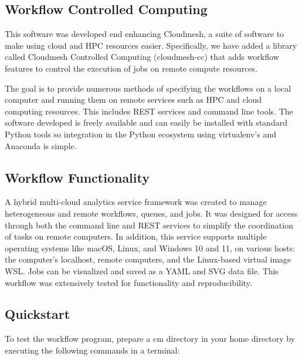 \subsection{Workflow Controlled
Computing}\label{workflow-controlled-computing}

This software was developed end enhancing Cloudmesh, a suite of software
to make using cloud and HPC resources easier. Specifically, we have
added a library called Cloudmesh Controlled Computing (cloudmesh-cc)
that adds workflow features to control the execution of jobs on remote
compute resources.

The goal is to provide numerous methods of specifying the workflows on a
local computer and running them on remote services such as HPC and cloud
computing resources. This includes REST services and command line tools.
The software developed is freely available and can easily be installed
with standard Python tools so integration in the Python ecosystem using
virtualenv's and Anaconda is simple.


\subsection{Workflow Functionality}\label{workflow-functionality}

A hybrid multi-cloud analytics service framework was created to manage
heterogeneous and remote workflows, queues, and jobs. It was designed
for access through both the command line and REST services to simplify
the coordination of tasks on remote computers. In addition, this service
supports multiple operating systems like macOS, Linux, and Windows 10
and 11, on various hosts: the computer's localhost, remote computers,
and the Linux-based virtual image WSL. Jobs can be visualized and saved
as a YAML and SVG data file. This workflow was extensively tested for
functionality and reproducibility.

\subsection{Quickstart}\label{quickstart}

To test the workflow program, prepare a cm directory in your home
directory by executing the following commands in a terminal:

\begin{Shaded}
\begin{Highlighting}[]
\NormalTok{ \textasciitilde{}}
   \OperatorTok{=}
\end{Highlighting}
\end{Shaded}

